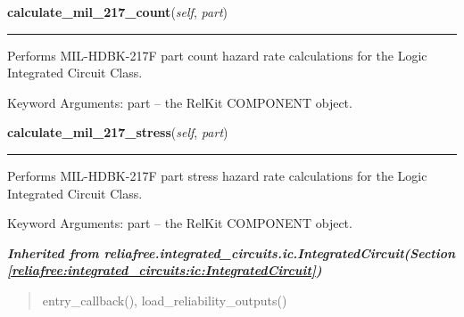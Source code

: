 \hspace{.8\funcindent}\begin{boxedminipage}{\funcwidth}

    \raggedright \textbf{calculate\_mil\_217\_count}(\textit{self}, \textit{part})

    \vspace{-1.5ex}

    \rule{\textwidth}{0.5\fboxrule}
\setlength{\parskip}{2ex}
    Performs MIL-HDBK-217F part count hazard rate calculations for the 
    Logic Integrated Circuit Class.

    Keyword Arguments: part -- the RelKit COMPONENT object.

\setlength{\parskip}{1ex}
    \end{boxedminipage}

    \label{reliafree:integrated_circuits:logic:Logic:calculate_mil_217_stress}

    \vspace{0.5ex}

\hspace{.8\funcindent}\begin{boxedminipage}{\funcwidth}

    \raggedright \textbf{calculate\_mil\_217\_stress}(\textit{self}, \textit{part})

    \vspace{-1.5ex}

    \rule{\textwidth}{0.5\fboxrule}
\setlength{\parskip}{2ex}
    Performs MIL-HDBK-217F part stress hazard rate calculations for the 
    Logic Integrated Circuit Class.

    Keyword Arguments: part -- the RelKit COMPONENT object.

\setlength{\parskip}{1ex}
    \end{boxedminipage}


\large{\textbf{\textit{Inherited from reliafree.integrated\_circuits.ic.IntegratedCircuit\textit{(Section \ref{reliafree:integrated_circuits:ic:IntegratedCircuit})}}}}

\begin{quote}
entry\_callback(), load\_reliability\_outputs()
\end{quote}
